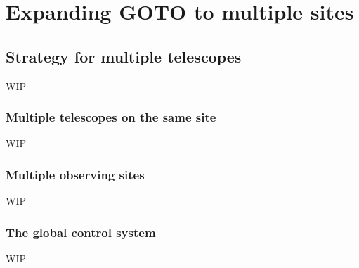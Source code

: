 \chapter{Expanding GOTO to multiple sites}
\label{chap:multiscope}
\chaptoc{}


\newpage
\section{Strategy for multiple telescopes}
\label{sec:multiscope}
\begin{colsection}


\begin{colsection}

WIP

\end{colsection}


\subsection{Multiple telescopes on the same site}
\label{sec:onesite}
\begin{colsection}

WIP

\end{colsection}


\subsection{Multiple observing sites}
\label{sec:multisite}
\begin{colsection}

WIP

\end{colsection}


\subsection{The global control system}
\label{sec:global}
\begin{colsection}

WIP

\end{colsection}


\end{colsection}

